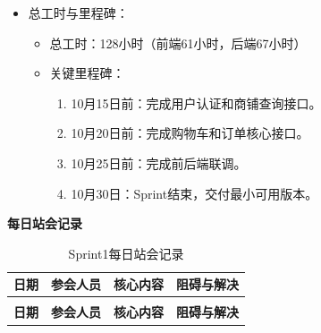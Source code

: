 \begin{levellist}
\begin{itemize}
        \item 总工时与里程碑：
              \begin{itemize}
                  \item 总工时：128小时（前端61小时，后端67小时）
                  \item 关键里程碑：
                        \begin{enumerate}
                            \item 10月15日前：完成用户认证和商铺查询接口。
                            \item 10月20日前：完成购物车和订单核心接口。
                            \item 10月25日前：完成前后端联调。
                            \item 10月30日：Sprint结束，交付最小可用版本。
                        \end{enumerate}

              \end{itemize}

    \end{itemize}

    \item \textbf{每日站会记录}

    \begin{longtable}{>{\centering\arraybackslash}m{1cm} >{\centering\arraybackslash}m{1cm} >{\centering\arraybackslash}m{8.5cm} >{\centering\arraybackslash}m{3cm}}

        \caption{Sprint1每日站会记录} \label{tab:training}                                                                                                                                                                                                     \\

        \toprule
        \textbf{日期}                                         & \textbf{参会人员}                                                                    & \textbf{核心内容}                                                                          & \textbf{阻碍与解决} \\
        \midrule
        \endfirsthead

        \multicolumn{4}{c}{{\tablename\ \thetable{} 续表}}                                                                                                                                                                                                 \\
        \toprule
        \textbf{日期}                                         & \textbf{参会人员}                                                                    & \textbf{核心内容}                                                                          & \textbf{阻碍与解决} \\
        \midrule
        \endhead


\end{longtable}
\end{levellist}
